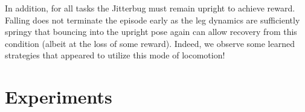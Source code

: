 \documentclass{article}
\begin{document}
In addition, for all tasks the Jitterbug must remain upright to achieve reward.
Falling does not terminate the episode early as the leg dynamics are sufficiently springy that bouncing into the upright pose again can allow recovery from this condition (albeit at the loss of some reward).
Indeed, we observe some learned strategies that appeared to utilize this mode of locomotion!

\section{Experiments}

\begin{table}[h!]
    
    \centering
    \caption{
        \textbf{RL Algorithm hyper-parameters.}
        Values not shown used the defaults from the \texttt{stable\_baselines} package.
    }
    \label{tab:hyper-params}
    
    {\def\arraystretch{1.2}
        }
\end{table}
\end{document}
